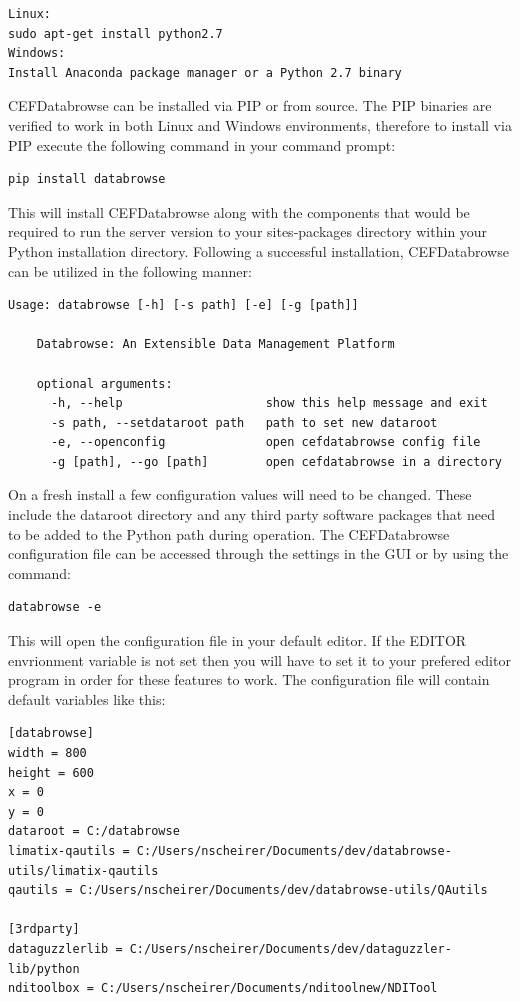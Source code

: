 \documentclass[10pt]{article}
\begin{document}
\begin{verbatim}
Linux:
sudo apt-get install python2.7
Windows:
Install Anaconda package manager or a Python 2.7 binary
\end{verbatim}

CEFDatabrowse can be installed via PIP or from source. The PIP binaries are verified to work in both Linux and Windows environments, therefore to install via PIP execute the following command in your command prompt:

\begin{verbatim}
pip install databrowse
\end{verbatim}

This will install CEFDatabrowse along with the components that would be required to run the server version to your sites-packages directory within your Python installation directory. Following a successful installation, CEFDatabrowse can be utilized in the following manner:

\begin{verbatim}
Usage: databrowse [-h] [-s path] [-e] [-g [path]]

    Databrowse: An Extensible Data Management Platform

    optional arguments:
      -h, --help                    show this help message and exit
      -s path, --setdataroot path   path to set new dataroot
      -e, --openconfig              open cefdatabrowse config file
      -g [path], --go [path]        open cefdatabrowse in a directory
\end{verbatim}

On a fresh install a few configuration values will need to be changed. These include the dataroot directory and any third party software packages that need to be added to the Python path during operation. The CEFDatabrowse configuration file can be accessed through the settings in the GUI or by using the command:

\begin{verbatim}
databrowse -e
\end{verbatim}

This will open the configuration file in your default editor. If the EDITOR envrionment variable is not set then you will have to set it to your prefered editor program in order for these features to work. The configuration file will contain default variables like this:

\begin{verbatim}
[databrowse]
width = 800
height = 600
x = 0
y = 0
dataroot = C:/databrowse
limatix-qautils = C:/Users/nscheirer/Documents/dev/databrowse-utils/limatix-qautils
qautils = C:/Users/nscheirer/Documents/dev/databrowse-utils/QAutils

[3rdparty]
dataguzzlerlib = C:/Users/nscheirer/Documents/dev/dataguzzler-lib/python
nditoolbox = C:/Users/nscheirer/Documents/nditoolnew/NDITool
\end{verbatim}
\end{document}
